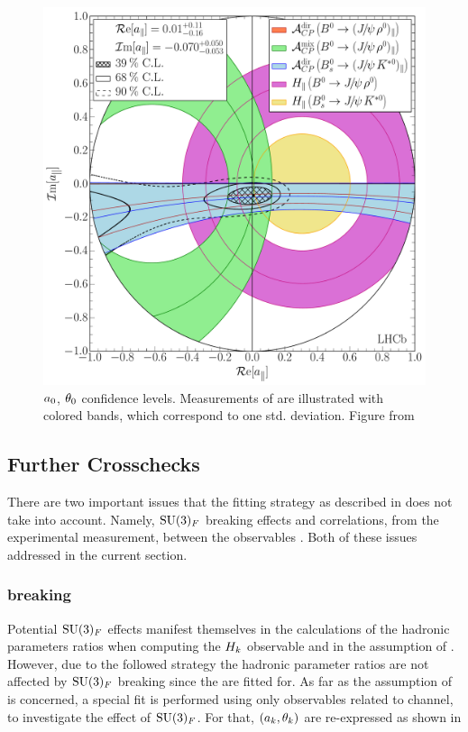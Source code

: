 \begin{figure}[!h]
\centering
  \includegraphics[trim=0.0cm 0.0cm 0.0cm 0.0cm, clip=true,scale=0.4]{Figures/Chapter5/Penguin_Contribution_Re_vs_Im_allB2VV_Para_withH.pdf}
  \caption{$a_{0}$, $\theta_{0}$ confidence levels. Measurements of  are illustrated with 
           colored bands, which correspond to one std. deviation. Figure from \cite{DeBruyn-thesis}}
  \label{pengPlot_para}
\end{figure}

\subsection{Further Crosschecks}
There are two important issues that the fitting strategy as described in 
does not take into account. Namely, $\mathrm{SU}(3)_F$ breaking effects and correlations, from the
experimental measurement, between the observables . Both of these issues
addressed in the current section.

\subsubsection{\grpsuthree breaking}
\label{su3_breaking}
Potential $\mathrm{SU}(3)_F$ effects manifest themselves in the calculations of the hadronic parameters ratios
when computing the $H_{k}$ observable and in the assumption of . However, due to the
followed strategy the hadronic parameter ratios are not affected by $\mathrm{SU}(3)_F$ breaking since the are fitted for.
As far as the assumption of  is concerned, a special fit is performed using only observables
related to \BdJpsiRho channel, to investigate the effect of $\mathrm{SU}(3)_F$. For that, $(a_k,\theta_k)$
are re-expressed as shown in 


